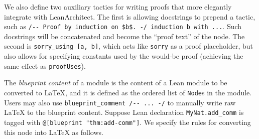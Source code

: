 \documentclass{article}
\newcommand{\leanarchitect}{LeanArchitect\xspace}
\newcommand\leancode{\lstinline[language=lean]}
\begin{document}
We also define two auxiliary tactics for writing proofs that more elegantly integrate with \leanarchitect. The first is allowing docstrings to prepend a tactic, such as \leancode{/-- Proof by induction on $b$. -/ induction b with ...}. Such docstrings will be concatenated and become the ``proof text'' of the node. The second is \leancode{sorry_using [a, b]}, which acts like \leancode{sorry} as a proof placeholder, but also allows for specifying constants used by the would-be proof (achieving the same effect as \leancode{proofUses}).

The \emph{blueprint content} of a module is the content of a Lean module to be converted to \LaTeX{}, and it is defined as the ordered list of \leancode{Node}s in the module. Users may also use \leancode{blueprint_comment /-- ... -/} to manually write raw \LaTeX{} to the blueprint content. Suppose Lean declaration \leancode{MyNat.add_comm} is tagged with \leancode{@[blueprint "thm:add-comm"]}. We specify the rules for converting this node into \LaTeX{} as follows.
\end{document}
